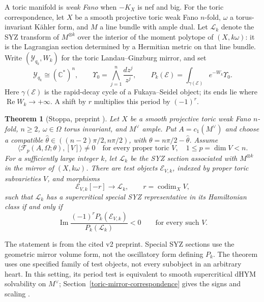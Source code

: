 \documentclass[12pt,reqno]{amsart}
\numberwithin{equation}{section}
\theoremstyle{plain}
\newtheorem{theorem}{Theorem}[section]
\theoremstyle{definition}
\newcommand{\cF}{\mathcal F}
\newcommand{\C}{\mathbb C}
\newcommand{\ToricMirrorStatement}{%
Let $X$ be a smooth projective toric weak Fano $n$-fold, $n\geq2$,
$\omega\in\Omega$ torus invariant, and $M^\vee$ ample. Put
$A=c_1(M^\vee)$ and choose a compatible
$\widehat\theta\in((n-2)\pi/2,n\pi/2)$, with
$\theta=n\pi/2-\widehat\theta$. Assume
\[
 \langle\cF_p(A,\Omega;\theta),[V]\rangle\ne0
 \quad\text{for every proper toric }V,
 \quad 1\leq p=\dim V<n.
\]
For a sufficiently large integer $k$, let $\mathcal L_k$ be the SYZ
section associated with $M^{\otimes k}$ in the mirror of $(X,k\omega)$.
There are test objects $\mathcal E_{V,k}$, indexed by proper toric
subvarieties $V$, and morphisms
\[
 \mathcal E_{V,k}[-r]\longrightarrow\mathcal L_k,
 \qquad r=\operatorname{codim}_X V,
\]
such that $\mathcal L_k$ has a supercritical special SYZ representative
in its Hamiltonian class if and only if
\[
 \operatorname{Im}\frac{(-1)^rP_k(\mathcal E_{V,k})}
                          {P_k(\mathcal L_k)}<0
 \qquad\text{for every such }V.
\]
}
\begin{document}
A toric manifold is \emph{weak Fano} when $-K_X$ is nef and big.
For the toric correspondence, let $X$ be a smooth projective toric
weak Fano $n$-fold, $\omega$ a torus-invariant K\"ahler form, and $M$
a line bundle with ample dual. Let $\mathcal L_k$ denote the SYZ transform
of $M^{\otimes k}$ over the interior of the moment polytope of $(X,k\omega)$:
it is the Lagrangian section determined by a Hermitian metric on that
line bundle. Write $(\mathcal Y_{q_k},W_k)$ for the toric
Landau--Ginzburg mirror, and set
\[
 \mathcal Y_{q_k}\cong(\C^*)^n,\qquad
 \Upsilon_0=\bigwedge_{j=1}^n\frac{dz^j}{z^j},\qquad
 P_k(\mathcal E)=\int_{\gamma(\mathcal E)}e^{-W_k}\Upsilon_0.
\]
Here $\gamma(\mathcal E)$ is the rapid-decay cycle of a
Fukaya--Seidel object; its ends lie where $\operatorname{Re}W_k\to+\infty$.
A shift by $r$ multiplies this period by $(-1)^r$.
\begin{theorem}[Stoppa, preprint {\cite[Theorem 1.2 and Corollary 2.7]{Sto25}}]
\label{thm-toric-mirror}
\ToricMirrorStatement
\end{theorem}
The statement is from the cited v2 preprint. Special SYZ sections
use the geometric mirror volume form, not the oscillatory form defining
$P_k$. The theorem uses one specified family of test objects, not every
subobject in an arbitrary heart. In this setting, its period test is
equivalent to smooth supercritical dHYM solvability on $M^\vee$;
Section~\ref{toric-mirror-correspondence} gives the signs and scaling
\cite[Section 2]{Sto25}.
\end{document}
